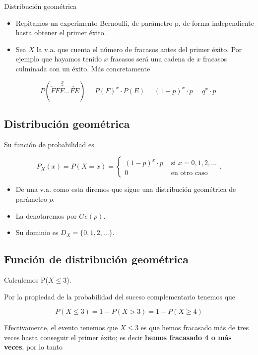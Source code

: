 \documentclass[]{book}
\providecommand{\tightlist}{%
  \setlength{\itemsep}{0pt}\setlength{\parskip}{0pt}}
\begin{document}
 Distribución geométrica

\begin{itemize}
\tightlist
\item
  Repitamos un experimento Bernoulli, de parámetro p, de forma independiente hasta obtener el primer éxito.
\item
  Sea \(X\) la v.a. que cuenta el número de fracasos antes del primer éxito. Por ejemplo que hayamos tenido \(x\) fracasos será una cadena de \(x\) fracasos culminada con un éxito. Más concretamente
\end{itemize}

\[P(\overbrace{FFF\ldots F}^{x}E)=P(F)^{x}\cdot P(E)=(1-p)^{x}\cdot p=q^{x}\cdot p.\]

\hypertarget{distribuciuxf3n-geomuxe9trica-3}{%
\subsection{Distribución geométrica}\label{distribuciuxf3n-geomuxe9trica-3}}

Su función de probabilidad es

\[
P_X(x)=P(X=x)=\left\{\begin{array}{ll}
(1-p)^{x}\cdot p & \mbox{ si } x=0,1,2,\ldots\\
0 &\mbox{ en otro caso}
\end{array}\right..
\]

\begin{itemize}
\tightlist
\item
  De una v.a. como esta diremos que sigue una
  distribución geométrica de parámetro \(p\).
\item
  La denotaremos por \(Ge(p)\).
\item
  Su dominio es \(D_X=\{0,1,2,\ldots\}\).
\end{itemize}

\hypertarget{funciuxf3n-de-distribuciuxf3n-geomuxe9trica}{%
\subsection{Función de distribución geométrica}\label{funciuxf3n-de-distribuciuxf3n-geomuxe9trica}}

Calculemos P(\(X\leq 3\)).

Por la propiedad de la probabilidad del suceso complementario tenemos que

\[
P(X\leq 3 )=1-P(X> 3)=1-P(X\geq 4)
\]

Efectivamente, el evento tenemos que \(X\leq 3\) es que hemos fracasado más de tres veces hasta conseguir el primer éxito; es decir \textbf{hemos fracasado 4 o más veces}, por lo tanto
\end{document}

